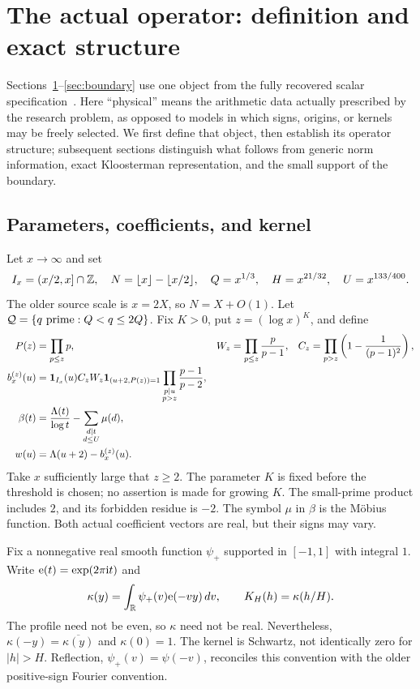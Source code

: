 \section{The actual operator: definition and exact structure}\label{sec:operator}
Sections~\ref{sec:operator}--\ref{sec:boundary} use one object from the fully recovered scalar specification~\cite{archivev59,archivephysical}. Here ``physical'' means the arithmetic data actually prescribed by the research problem, as opposed to models in which signs, origins, or kernels may be freely selected. We first define that object, then establish its operator structure; subsequent sections distinguish what follows from generic norm information, exact Kloosterman representation, and the small support of the boundary.

\subsection{Parameters, coefficients, and kernel}
Let $x\to\infty$ and set
\[
I_x=(x/2,x]\cap\mathbb Z,\quad N=\lfloor x\rfloor-\lfloor x/2\rfloor,\quad
Q=x^{1/3},\quad H=x^{21/32},\quad U=x^{133/400}.
\]
The older source scale is $x=2X$, so $N=X+O(1)$. Let $\mathcal Q=\{q\text{ prime}:Q<q\le2Q\}$. Fix $K>0$, put $z=(\log x)^K$, and define
\begin{align}
P(z)&=\prod_{p\le z}p,&W_z&=\prod_{p\le z}\frac p{p-1},&
C_z&=\prod_{p>z}\left(1-\frac1{(p-1)^2}\right),\nonumber\\
b_x^{(z)}(u)&=\mathbf 1_{I_x}(u)C_zW_z\mathbf 1_{(u+2,P(z))=1}
\prod_{\substack{p\mid u\\p>z}}\frac{p-1}{p-2},\label{eq:hybrid}\\
\beta(t)&=\frac{\Lambda(t)}{\log t}-\sum_{\substack{d\mid t\\d\le U}}\mu(d),\nonumber\\
w(u)&=\Lambda(u+2)-b_x^{(z)}(u).\label{eq:lanes}
\end{align}
Take $x$ sufficiently large that $z\ge2$. The parameter $K$ is fixed before the threshold is chosen; no assertion is made for growing $K$. The small-prime product includes $2$, and its forbidden residue is $-2$. The symbol $\mu$ in $\beta$ is the M\"obius function. Both actual coefficient vectors are real, but their signs may vary.

Fix a nonnegative real smooth function $\psi_+$ supported in $[-1,1]$ with integral $1$. Write $\mathrm e(t)=\exp(2\pi\mathrm i t)$ and
\[
\kappa(y)=\int_{\mathbb R}\psi_+(v)\mathrm e(-vy)\,dv,\qquad K_H(h)=\kappa(h/H).
\]
The profile need not be even, so $\kappa$ need not be real. Nevertheless, $\kappa(-y)=\overline{\kappa(y)}$ and $\kappa(0)=1$. The kernel is Schwartz, not identically zero for $|h|>H$. Reflection, $\psi_+(v)=\psi(-v)$, reconciles this convention with the older positive-sign Fourier convention.

